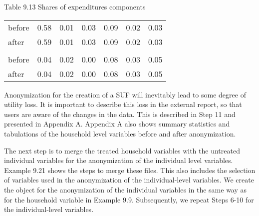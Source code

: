 \documentclass[letterpaper,10pt,english]{sphinxmanual}
\begin{document}
Table 9.13 Shares of expenditures components


\begin{savenotes}\sphinxattablestart
\centering
\begin{tabulary}{\linewidth}[t]{|T|T|T|T|T|T|T|}
\hline
\sphinxstyletheadfamily &\sphinxstyletheadfamily 
{}
&\sphinxstyletheadfamily 
{}
&\sphinxstyletheadfamily 
{}
&\sphinxstyletheadfamily 
{}
&\sphinxstyletheadfamily 
{}
&\sphinxstyletheadfamily 
{}
\\
\hline
before
&
0.58
&
0.01
&
0.03
&
0.09
&
0.02
&
0.03
\\
\hline
after
&
0.59
&
0.01
&
0.03
&
0.09
&
0.02
&
0.03
\\
\hline&
&
&
&
&
&
\\
\hline
before
&
0.04
&
0.02
&
0.00
&
0.08
&
0.03
&
0.05
\\
\hline
after
&
0.04
&
0.02
&
0.00
&
0.08
&
0.03
&
0.05
\\
\hline
\end{tabulary}
\par
\sphinxattableend\end{savenotes}

Anonymization for the creation of a SUF will inevitably lead to some
degree of utility loss. It is important to describe this loss in the
external report, so that users are aware of the changes in the data.
This is described in Step 11 and presented in Appendix A. Appendix A
also shows summary statistics and tabulations of the household level
variables before and after anonymization.


The next step is to merge the treated household variables with the
untreated individual variables for the anonymization of the individual
level variables. Example 9.21 shows the steps to merge these files. This
also includes the selection of variables used in the anonymization of
the individual-level variables. We create the  object for the
anonymization of the individual variables in the same way as for the
household variable in Example 9.9. Subsequently, we repeat Steps 6-10
for the individual-level variables.
\end{document}
